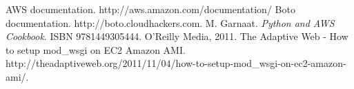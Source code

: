 \documentclass[conference]{IEEEtran}
\begin{document}


%
%
%
\begin{thebibliography}{99}
 AWS documentation. http://aws.amazon.com/documentation/
 Boto documentation. http://boto.cloudhackers.com.
 M. Garnaat. \emph{Python and AWS Cookbook}. ISBN 9781449305444. O'Reilly Media, 2011.
 The Adaptive Web - How to setup mod\_wsgi on EC2 Amazon AMI. http://theadaptiveweb.org/2011/11/04/how-to-setup-mod\_wsgi-on-ec2-amazon-ami/.
\end{thebibliography}




\end{document}

